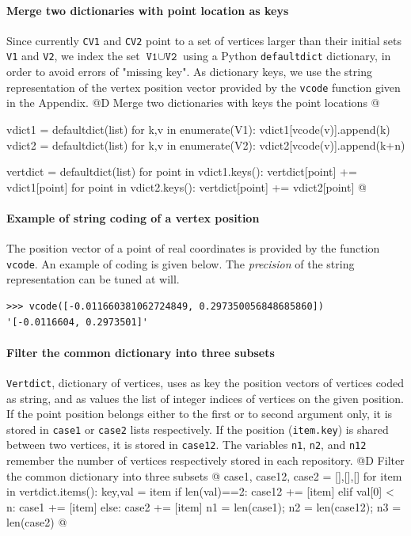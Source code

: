 \documentclass[11pt,oneside]{article}	%
\begin{document}
\paragraph{Merge two dictionaries with point location as keys}
Since currently \texttt{CV1} and \texttt{CV2} point to a set of vertices larger than their initial sets 
\texttt{V1} and \texttt{V2}, we index the set $\texttt{V1} \cup \texttt{V2}$ using a Python \texttt{defaultdict} dictionary, in order to avoid errors of "missing key". As dictionary keys, we use the string representation of the vertex position vector provided by the \texttt{vcode} function given in the Appendix.
@D Merge two dictionaries with keys the point locations
@{	
	vdict1 = defaultdict(list)
	for k,v in enumerate(V1): vdict1[vcode(v)].append(k) 
	vdict2 = defaultdict(list)
	for k,v in enumerate(V2): vdict2[vcode(v)].append(k+n) 
	
	vertdict = defaultdict(list)
	for point in vdict1.keys(): vertdict[point] += vdict1[point]
	for point in vdict2.keys(): vertdict[point] += vdict2[point]
@}

\paragraph{Example of string coding of a vertex position}
The position vector of a point of real coordinates is provided by the function \texttt{vcode}.
An example of coding is given below. The \emph{precision} of the string representation can be tuned at will.
{\small
\begin{verbatim}
>>> vcode([-0.011660381062724849, 0.297350056848685860])
'[-0.0116604, 0.2973501]'
\end{verbatim}}



\paragraph{Filter the common dictionary into three subsets}
\texttt{Vertdict}, dictionary of vertices, uses as key the position vectors of vertices coded as string, and as values the list of integer indices of vertices on the given position. If the point position belongs either to the first or to second argument only, it is stored in \texttt{case1} or \texttt{case2} lists respectively. If the position (\texttt{item.key}) is shared between two vertices, it is stored in \texttt{case12}.
The variables \texttt{n1}, \texttt{n2}, and \texttt{n12} remember the number of vertices respectively stored in each repository.
@D Filter the common dictionary into three subsets
@{	
	case1, case12, case2 = [],[],[]
	for item in vertdict.items():
		key,val = item
		if len(val)==2:  case12 += [item]
		elif val[0] < n: case1 += [item]
		else: case2 += [item]
	n1 = len(case1); n2 = len(case12); n3 = len(case2)
@}
\end{document}
